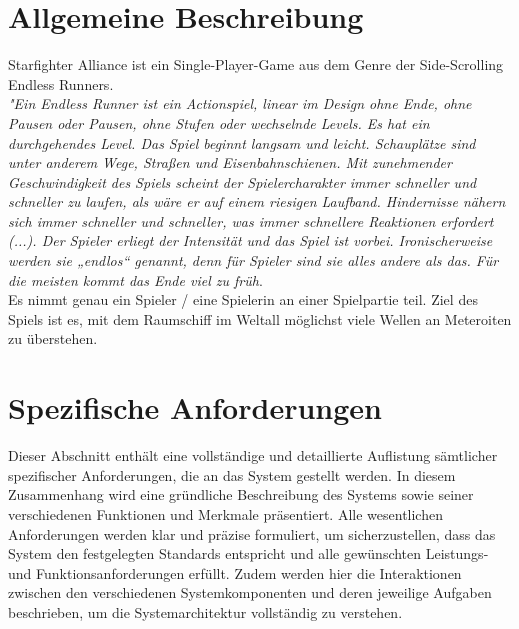 \documentclass[10pt]{article}
\begin{document}
    \section{Allgemeine Beschreibung}

    Starfighter Alliance ist ein Single-Player-Game aus dem Genre der Side-Scrolling Endless Runners.\\

\noindent \textit{"Ein Endless Runner ist ein Actionspiel, linear im Design ohne Ende, ohne Pausen oder Pausen, ohne Stufen oder wechselnde Levels. Es hat ein durchgehendes Level. Das Spiel beginnt langsam und leicht. Schauplätze sind unter anderem Wege, Straßen und Eisenbahnschienen. Mit zunehmender Geschwindigkeit des Spiels scheint der Spielercharakter immer schneller und schneller zu laufen, als wäre er auf einem riesigen Laufband. Hindernisse nähern sich immer schneller und schneller, was immer schnellere Reaktionen erfordert (...).  Der Spieler erliegt der Intensität und das Spiel ist vorbei. Ironischerweise werden sie „endlos“ genannt, denn für Spieler sind sie alles andere als das. Für die meisten kommt das Ende viel zu früh}.\footnotemark[2]\\

\noindent Es nimmt genau ein Spieler / eine Spielerin an einer Spielpartie teil. Ziel des Spiels ist es, mit dem Raumschiff im Weltall möglichst viele Wellen an Meteroiten zu überstehen.


\newpage

    \section{Spezifische Anforderungen}

  	Dieser Abschnitt enthält eine vollständige und detaillierte Auflistung sämtlicher spezifischer Anforderungen, die an das System gestellt werden. In 		diesem Zusammenhang wird eine gründliche Beschreibung des Systems sowie seiner verschiedenen Funktionen und Merkmale präsentiert. Alle wesentlichen 		Anforderungen werden klar und präzise formuliert, um sicherzustellen, dass das System den festgelegten Standards entspricht und alle gewünschten 			Leistungs- und Funktionsanforderungen erfüllt. Zudem werden hier die Interaktionen zwischen den verschiedenen Systemkomponenten und deren jeweilige 		Aufgaben beschrieben, um die Systemarchitektur vollständig zu verstehen.
\end{document}
